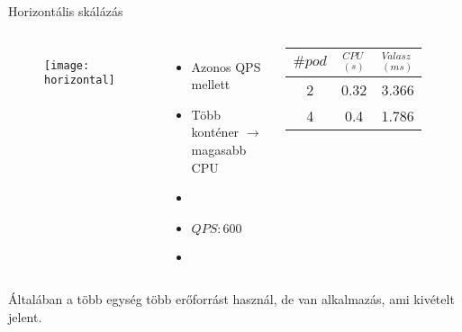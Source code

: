 \documentclass{beamer}
\begin{document}
\begin{frame}[t]{Horizontális skálázás}
\begin{columns}
	\begin{figure}
		\centering
		\texttt{[image: horizontal]} 
	\end{figure}

	\begin{itemize}
		\item Azonos QPS mellett
		\item Több konténer $\rightarrow$ magasabb CPU 
		\item[]
		\item[] $QPS: 600$
		\item[]
	\end{itemize}

\begin{tabular}{ c c c }
 $\#pod$ & $_{(s)}^{CPU}$ & $_{(ms)}^{V\acute{a}lasz}$ \\ [0.8ex] 
 \hline
 2 & 0.32 & 3.366 \\ 
 4 & 0.4  & 1.786 \\    
\end{tabular}
\end{columns}
Általában a több egység több erőforrást használ, de van alkalmazás, ami kivételt jelent.
\end{frame}
\end{document}

